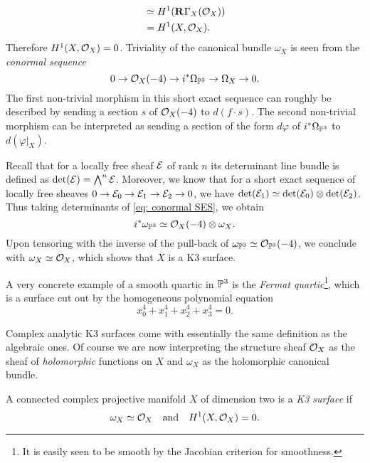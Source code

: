 \begin{example}
\begin{align*}
        &\simeq H^1(\mathbf{R}^{}\Gamma_X({\mathcal{O}_{X}})) \\
        & = H^{1}(X, {\mathcal{O}_{X}}).
    \end{align*}
    Therefore $H^{1}(X, {\mathcal{O}_{X}}) = 0$. Triviality of the canonical bundle $\omega_X$ is seen from the \emph{conormal sequence}
    \begin{equation}
        \label{eq: conormal SES}
        0 \to {\mathcal{O}_{X}}(-4) \to i^*\Omega_{\mathbb P^3} \to \Omega_X \to 0.
    \end{equation}
    The first non-trivial morphism in this short exact sequence can roughly be described by sending a section $s$ of ${\mathcal{O}_{X}}(-4)$ to $d(f \cdot s)$. The second non-trivial morphism can be interpreted as sending a section of the form $d\varphi$ of $i^*\Omega_{\mathbb P^3}$ to $d(\varphi|_X)$. 

    Recall that for a locally free sheaf $\mathcal E$ of rank $n$ its determinant line bundle is defined as $\det(\mathcal E) = \bigwedge^n \mathcal E$. Moreover, we know that for a short exact sequence of locally free sheaves $0 \to \mathcal E_0 \to \mathcal E_1 \to \mathcal E_2 \to 0$, we have $\det(\mathcal E_1) \simeq \det(\mathcal E_0) \otimes \det(\mathcal E_2)$. Thus taking determinants of \eqref{eq: conormal SES}, we obtain
    \[
        i^*\omega_{\mathbb P^3} \simeq {\mathcal{O}_{X}}(-4) \otimes \omega_X.
    \]
    Upon tensoring with the inverse of the pull-back of $\omega_{\mathbb P^3} \simeq {\mathcal{O}_{\mathbb P^3}}(-4)$, we conclude with $\omega_X \simeq {\mathcal{O}_{X}}$, which shows that $X$ is a K3 surface.
\end{example}

\begin{example}        
    A very concrete example of a smooth quartic in $\mathbb P^3$ is the \emph{Fermat quartic}\footnote{It is easily seen to be smooth by the Jacobian criterion for smoothness.}, which is a surface cut out by the homogeneous polynomial equation 
    \[
        x_0^4 + x_1^4 + x_2^4 + x_3^4 = 0.
    \]
\end{example}

Complex analytic K3 surfaces come with essentially the same definition as the algebraic ones. Of course we are now interpreting the structure sheaf ${\mathcal{O}_{X}}$ as the sheaf of \emph{holomorphic} functions on $X$ and $\omega_X$ as the holomorphic canonical bundle.  

\begin{definition}
    \label{Definition of complex K3}
    A connected complex projective manifold $X$ of dimension two is a \emph{K3 surface} if  
     \[
        \omega_X \simeq {\mathcal{O}_{X}} \quad \text{and} \quad H^{1}(X, {\mathcal{O}_{X}}) = 0.
    \]
\end{definition}

